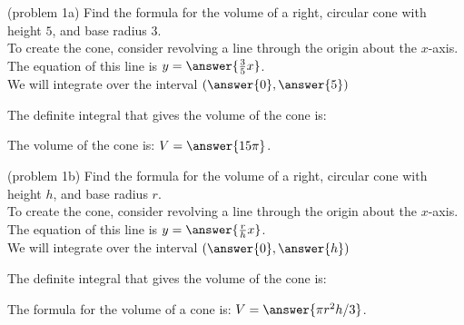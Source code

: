 \documentclass{ximera}
\begin{document}
\begin{problem}(problem 1a)
Find the formula for the volume of a right, circular cone with height $5$, and base radius $3$.\\

To create the cone, consider revolving a line through the origin about the $x$-axis.\\
The equation of this line is $y = \answer{\frac{3}{5} x}$.\\
We will integrate over the interval $\left(\answer{0},\answer{5}\right)$

The definite integral that gives the volume of the cone is:\\
\begin{multipleChoice}
\end{multipleChoice}

The volume of the cone is: \; $V = \answer{15 \pi }$.










\end{problem}



\begin{problem}(problem 1b)
Find the formula for the volume of a right, circular cone with height $h$, and base radius $r$.\\

To create the cone, consider revolving a line through the origin about the $x$-axis.\\
The equation of this line is $y = \answer{\frac{r}{h} x}$.\\
We will integrate over the interval $\left(\answer{0},\answer{h}\right)$

The definite integral that gives the volume of the cone is:\\
\begin{multipleChoice}
\end{multipleChoice}

The formula for the volume of a cone is: \; $V = \answer{\pi r^2 h/3}$.

\end{problem}
\end{document}
